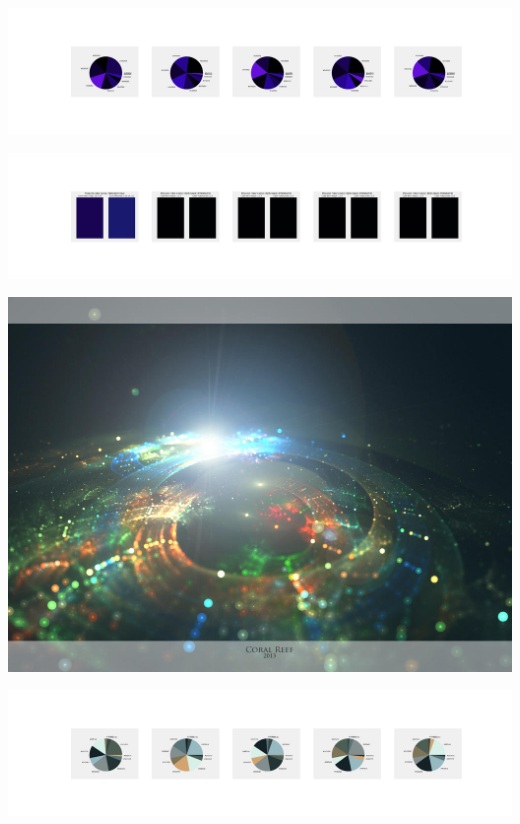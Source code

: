 \documentclass[11pt]{article}
\begin{document}
\begin{landscape}
    \begin{center}
    \includegraphics[width=250mm]{./nbimg/pie-440.jpg}
    \end{center}

    \begin{center}
    \includegraphics[width=250mm]{./nbimg/peak-440.jpg}
    \end{center}
    

    \begin{center}
    \includegraphics[width=\textwidth]{./nbimg/file (90).jpg}
    \end{center}

    \begin{center}
    \includegraphics[width=250mm]{./nbimg/pie-441.jpg}
    \end{center}


\end{landscape}
\end{document}
